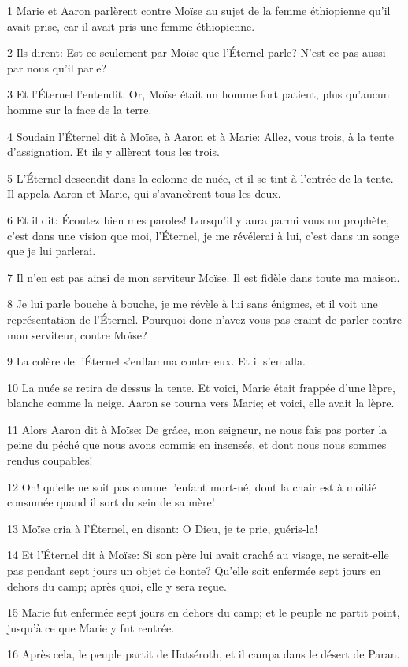 \par 1 Marie et Aaron parlèrent contre Moïse au sujet de la femme éthiopienne qu'il avait prise, car il avait pris une femme éthiopienne.
\par 2 Ils dirent: Est-ce seulement par Moïse que l'Éternel parle? N'est-ce pas aussi par nous qu'il parle?
\par 3 Et l'Éternel l'entendit. Or, Moïse était un homme fort patient, plus qu'aucun homme sur la face de la terre.
\par 4 Soudain l'Éternel dit à Moïse, à Aaron et à Marie: Allez, vous trois, à la tente d'assignation. Et ils y allèrent tous les trois.
\par 5 L'Éternel descendit dans la colonne de nuée, et il se tint à l'entrée de la tente. Il appela Aaron et Marie, qui s'avancèrent tous les deux.
\par 6 Et il dit: Écoutez bien mes paroles! Lorsqu'il y aura parmi vous un prophète, c'est dans une vision que moi, l'Éternel, je me révélerai à lui, c'est dans un songe que je lui parlerai.
\par 7 Il n'en est pas ainsi de mon serviteur Moïse. Il est fidèle dans toute ma maison.
\par 8 Je lui parle bouche à bouche, je me révèle à lui sans énigmes, et il voit une représentation de l'Éternel. Pourquoi donc n'avez-vous pas craint de parler contre mon serviteur, contre Moïse?
\par 9 La colère de l'Éternel s'enflamma contre eux. Et il s'en alla.
\par 10 La nuée se retira de dessus la tente. Et voici, Marie était frappée d'une lèpre, blanche comme la neige. Aaron se tourna vers Marie; et voici, elle avait la lèpre.
\par 11 Alors Aaron dit à Moïse: De grâce, mon seigneur, ne nous fais pas porter la peine du péché que nous avons commis en insensés, et dont nous nous sommes rendus coupables!
\par 12 Oh! qu'elle ne soit pas comme l'enfant mort-né, dont la chair est à moitié consumée quand il sort du sein de sa mère!
\par 13 Moïse cria à l'Éternel, en disant: O Dieu, je te prie, guéris-la!
\par 14 Et l'Éternel dit à Moïse: Si son père lui avait craché au visage, ne serait-elle pas pendant sept jours un objet de honte? Qu'elle soit enfermée sept jours en dehors du camp; après quoi, elle y sera reçue.
\par 15 Marie fut enfermée sept jours en dehors du camp; et le peuple ne partit point, jusqu'à ce que Marie y fut rentrée.
\par 16 Après cela, le peuple partit de Hatséroth, et il campa dans le désert de Paran.

